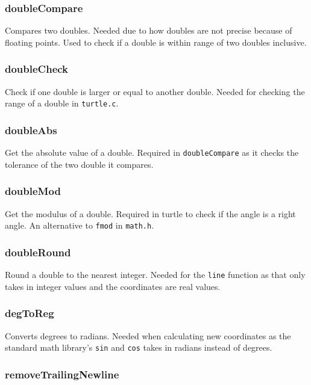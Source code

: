 \documentclass[a4paper, 12pt, titlepage]{article}
\newcommand{\code}[1]{\small\texttt{#1}\normalsize}
\begin{document}
\subsubsection{doubleCompare}

Compares two doubles. Needed due to how doubles are not precise because of
floating points. Used to check if a double is within range of two doubles
inclusive.

\subsubsection{doubleCheck}

Check if one double is larger or equal to another double. Needed for
checking the range of a double in \code{turtle.c}.

\subsubsection{doubleAbs}

Get the absolute value of a double. Required in \code{doubleCompare} as it
checks the tolerance of the two double it compares.

\subsubsection{doubleMod}

Get the modulus of a double. Required in turtle to check if the angle is
a right angle. An alternative to \code{fmod} in \code{math.h}.

\subsubsection{doubleRound}

Round a double to the nearest integer. Needed for the \code{line} function
as that only takes in integer values and the coordinates are real values.

\subsubsection{degToReg}

Converts degrees to radians. Needed when calculating new coordinates as
the standard math library's \code{sin} and \code{cos} takes in radians
instead of degrees.

\subsubsection{removeTrailingNewline}
\end{document}
